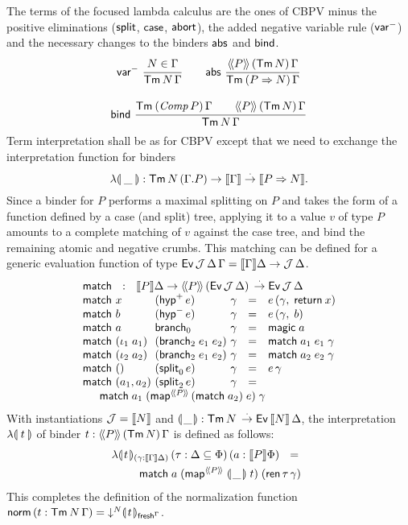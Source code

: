 \documentclass[sigplan,screen,fleqn]{acmart}
\begin{document}
The terms  of the focused lambda calculus are the
ones of CBPV minus the positive eliminations ($\tsplit$, $\tcase$,
$\tabort$), the added negative variable rule ($\nvar$) and the
necessary changes to the binders $\tabs$ and $\tbind$.
\begin{gather*}
  \nru{\nvar}{N \in \Gamma}{\Tm N \Gamma}
\qquad
  \nru{\tabs}
      {\AddHypP P {\tTm\, N} \Gamma}
      {\TmP {P \To N} \Gamma}
\\[2ex]
  \nru{\tbind}
      {\TmP {\Comp P} \Gamma \qquad \AddHypP P {\tTm\,N} \Gamma}
      {\Tm N \Gamma}
\end{gather*}
Term interpretation
shall be as for CBPV except that we need to exchange the
interpretation function for binders
\[
\fden\_ : \Tm N {(\cext
    \Gamma P)} \to \den \Gamma \todot \den{P \To N}
.\]
Since a binder
for $P$ performs a maximal splitting on $P$ and takes the form of a
function defined by a case (and split) tree,
applying it to a value $v$ of type $P$ amounts to a complete
matching of $v$ against the case tree, and bind the remaining
atomic and negative crumbs.  This matching can be defined for a
generic evaluation function of type
$\Evvv \J \Delta \Gamma = \den \Gamma \Delta \to \J\,\Delta$.
\[
\begin{array}{l@{~}l@{~}l@{~}lcl}
  \multicolumn 6 {l} {\tmatch ~~:~~ \den P \Delta \to
    \AddHypP P {\Evv \J \Delta} \todot \Evv \J \Delta }\\
  \tmatch & x & (\phyp\,e) & \gamma & = & e\,(\gamma,\; \treturn\,x) \\
  \tmatch & b & (\nhyp\,e) & \gamma & = & e\,(\gamma,\; b) \\
  \tmatch & a & \nbranch & \gamma & = & \tmagic\;a \\
  \tmatch & (\iota_1\;a_1) & (\bbranch\;e_1\;e_2) & \gamma & = &
    \tmatch\;a_1\;e_1\;\gamma \\
  \tmatch & (\iota_2\;a_2) & (\bbranch\;e_1\;e_2) & \gamma & = &
    \tmatch\;a_2\;e_2\;\gamma \\
  \tmatch & \ttempty & (\nsplit\,e) & \gamma & = & e\,\gamma \\
  \tmatch & (a_1,a_2) & (\bsplit\,e) & \gamma & = &
\\ \multicolumn 6 {@{\qquad}l}{
    \tmatch\;a_1\;(\tmap[\Add P]\,(\tmatch\;a_2)\;e)\;\gamma
}
\\
\end{array}
\]
With instantiations $\J = \den N$ and
$\denty\_ : \Tm N \todot \Evv {\den N} \Delta$,
the interpretation $\fden t$
of binder $t : \AddHypP P {\tTm\,N} \Gamma$
is defined as follows:
\begin{multline*}
  \fdent{t}
    {(\gamma : \den \Gamma \Delta)}
    \, (\tau : \Delta \sublist \Phi)
    \, (a : \den P \Phi)
    ~~=~~
\\ \qquad
    \tmatch
      \; a
      \; (\tmap[\Add P]\;\denty\_\;t)
      \; (\tren\,\tau\,\gamma)
\end{multline*}
This completes the definition of the normalization function
$\tnorm\, (t : \Tm N \Gamma)
  = \down N \dent t {\idenv\Gamma}$.
\end{document}
